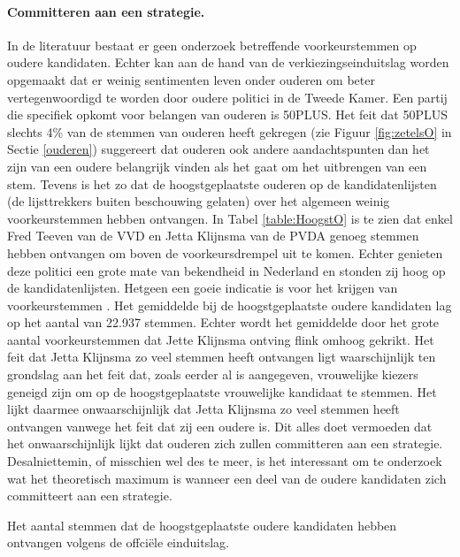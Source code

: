 \paragraph{Committeren aan een strategie.}
In de literatuur bestaat er geen onderzoek betreffende voorkeurstemmen op oudere kandidaten. Echter kan aan de hand van de verkiezingseinduitslag worden opgemaakt dat er weinig sentimenten leven onder ouderen om beter vertegenwoordigd te worden door oudere politici in de Tweede Kamer. Een partij die specifiek opkomt voor belangen van ouderen is 50PLUS. Het feit dat 50PLUS slechts 4\% van de stemmen van ouderen heeft gekregen (zie Figuur \ref{fig:zetelsO} in Sectie \ref{ouderen}) suggereert dat ouderen ook andere aandachtspunten dan het zijn van een oudere belangrijk vinden als het gaat om het uitbrengen van een stem. Tevens is het zo dat de hoogstgeplaatste ouderen op de kandidatenlijsten (de lijsttrekkers buiten beschouwing gelaten) over het algemeen weinig voorkeurstemmen hebben ontvangen. In Tabel \ref{table:HoogstO} is te zien dat enkel Fred Teeven van de VVD en Jetta Klijnsma van de PVDA genoeg stemmen hebben ontvangen om boven de voorkeursdrempel uit te komen. Echter genieten deze politici een grote mate van bekendheid in Nederland en stonden zij hoog op de kandidatenlijsten. Hetgeen een goeie indicatie is voor het krijgen van voorkeurstemmen \citep{van2012tweede}. Het gemiddelde bij de hoogstgeplaatste oudere kandidaten lag op het aantal van 22.937 stemmen. Echter wordt het gemiddelde door het grote aantal voorkeurstemmen dat Jette Klijnsma ontving flink omhoog gekrikt. Het feit dat Jetta Klijnsma zo veel stemmen heeft ontvangen ligt waarschijnlijk ten grondslag aan het feit dat, zoals eerder al is aangegeven, vrouwelijke kiezers geneigd zijn om op de hoogstgeplaatste vrouwelijke kandidaat te stemmen. Het lijkt daarmee onwaarschijnlijk dat Jetta Klijnsma zo veel stemmen heeft ontvangen vanwege het feit dat zij een oudere is. Dit alles doet vermoeden dat het onwaarschijnlijk lijkt dat ouderen zich zullen committeren aan een strategie. Desalniettemin, of misschien wel des te meer, is het interessant om te onderzoek wat het theoretisch maximum is wanneer een deel van de oudere kandidaten zich committeert aan een strategie. \\

\begin{table}[H]
\centering
	\begin{footnotesize}
		
	\end{footnotesize}
			\caption{Het aantal stemmen dat de hoogstgeplaatste oudere kandidaten hebben ontvangen volgens de offci\"{e}le einduitslag.}
\label{table:HoogstO} 
\end{table}

